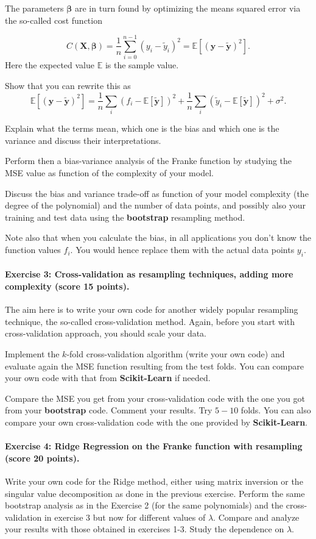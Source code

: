 \documentclass[%
oneside,                 %
final,                   %
10pt]{article}
\begin{document}
The parameters $\bm{\beta}$ are in turn found by optimizing the means
squared error via the so-called cost function

\[
C(\bm{X},\bm{\beta}) =\frac{1}{n}\sum_{i=0}^{n-1}(y_i-\tilde{y}_i)^2=\mathbb{E}\left[(\bm{y}-\bm{\tilde{y}})^2\right].
\]
Here the expected value $\mathbb{E}$ is the sample value. 

Show that you can rewrite  this as
\[
\mathbb{E}\left[(\bm{y}-\bm{\tilde{y}})^2\right]=\frac{1}{n}\sum_i(f_i-\mathbb{E}\left[\bm{\tilde{y}}\right])^2+\frac{1}{n}\sum_i(\tilde{y}_i-\mathbb{E}\left[\bm{\tilde{y}}\right])^2+\sigma^2.
\]

Explain what the terms mean, which one is the bias and which one is
the variance and discuss their interpretations.

Perform then a bias-variance analysis of the Franke function by
studying the MSE value as function of the complexity of your model.

Discuss the bias and variance trade-off as function
of your model complexity (the degree of the polynomial) and the number
of data points, and possibly also your training and test data using the \textbf{bootstrap} resampling method.

Note also that when you calculate the bias, in all applications you don't know the function values $f_i$. You would hence replace them with the actual data points $y_i$.


\paragraph{Exercise 3:  Cross-validation as resampling techniques, adding more complexity (score 15 points).}
The aim here is to write your own code for another widely popular
resampling technique, the so-called cross-validation method.  Again,
before you start with cross-validation approach, you should scale your
data.

Implement the $k$-fold cross-validation algorithm (write your own
code) and evaluate again the MSE function resulting
from the test folds. You can compare your own code with that from
\textbf{Scikit-Learn} if needed. 

Compare the MSE you get from your cross-validation code with the one
you got from your \textbf{bootstrap} code. Comment your results. Try $5-10$
folds.  You can also compare your own cross-validation code with the
one provided by \textbf{Scikit-Learn}.


\paragraph{Exercise 4: Ridge Regression on the Franke function  with resampling (score 20 points).}
Write your own code for the Ridge method, either using matrix
inversion or the singular value decomposition as done in the previous
exercise. Perform the same bootstrap analysis as in the
Exercise 2  (for the same polynomials) and the cross-validation  in exercise 3 but now for different values of $\lambda$. Compare and
analyze your results with those obtained in exercises 1-3. Study the
dependence on $\lambda$.
\end{document}
